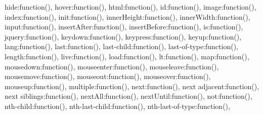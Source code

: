 \textquotesingle{}hide\textquotesingle{}\+:function()\lcurly{}\rcurly{}, \textquotesingle{}hover\textquotesingle{}\+:function()\lcurly{}\rcurly{}, \textquotesingle{}html\textquotesingle{}\+:function()\lcurly{}\rcurly{}, \textquotesingle{}id\textquotesingle{}\+:function()\lcurly{}\rcurly{}, \textquotesingle{}image\textquotesingle{}\+:function()\lcurly{}\rcurly{}, \textquotesingle{}index\textquotesingle{}\+:function()\lcurly{}\rcurly{}, \textquotesingle{}init\textquotesingle{}\+:function()\lcurly{}\rcurly{}, \textquotesingle{}inner\+Height\textquotesingle{}\+:function()\lcurly{}\rcurly{}, \textquotesingle{}inner\+Width\textquotesingle{}\+:function()\lcurly{}\rcurly{}, \textquotesingle{}input\textquotesingle{}\+:function()\lcurly{}\rcurly{}, \textquotesingle{}insert\+After\textquotesingle{}\+:function()\lcurly{}\rcurly{}, \textquotesingle{}insert\+Before\textquotesingle{}\+:function()\lcurly{}\rcurly{}, \textquotesingle{}is\textquotesingle{}\+:function()\lcurly{}\rcurly{}, \textquotesingle{}jquery\textquotesingle{}\+:function()\lcurly{}\rcurly{}, \textquotesingle{}keydown\textquotesingle{}\+:function()\lcurly{}\rcurly{}, \textquotesingle{}keypress\textquotesingle{}\+:function()\lcurly{}\rcurly{}, \textquotesingle{}keyup\textquotesingle{}\+:function()\lcurly{}\rcurly{}, \textquotesingle{}lang\textquotesingle{}\+:function()\lcurly{}\rcurly{}, \textquotesingle{}last\textquotesingle{}\+:function()\lcurly{}\rcurly{}, \textquotesingle{}last-\/child\textquotesingle{}\+:function()\lcurly{}\rcurly{}, \textquotesingle{}last-\/of-\/type\textquotesingle{}\+:function()\lcurly{}\rcurly{}, \textquotesingle{}length\textquotesingle{}\+:function()\lcurly{}\rcurly{}, \textquotesingle{}live\textquotesingle{}\+:function()\lcurly{}\rcurly{}, \textquotesingle{}load\textquotesingle{}\+:function()\lcurly{}\rcurly{}, \textquotesingle{}lt\textquotesingle{}\+:function()\lcurly{}\rcurly{}, \textquotesingle{}map\textquotesingle{}\+:function()\lcurly{}\rcurly{}, \textquotesingle{}mousedown\textquotesingle{}\+:function()\lcurly{}\rcurly{}, \textquotesingle{}mouseenter\textquotesingle{}\+:function()\lcurly{}\rcurly{}, \textquotesingle{}mouseleave\textquotesingle{}\+:function()\lcurly{}\rcurly{}, \textquotesingle{}mousemove\textquotesingle{}\+:function()\lcurly{}\rcurly{}, \textquotesingle{}mouseout\textquotesingle{}\+:function()\lcurly{}\rcurly{}, \textquotesingle{}mouseover\textquotesingle{}\+:function()\lcurly{}\rcurly{}, \textquotesingle{}mouseup\textquotesingle{}\+:function()\lcurly{}\rcurly{}, \textquotesingle{}multiple\textquotesingle{}\+:function()\lcurly{}\rcurly{}, \textquotesingle{}next\textquotesingle{}\+:function()\lcurly{}\rcurly{}, \textquotesingle{}next adjacent\textquotesingle{}\+:function()\lcurly{}\rcurly{}, \textquotesingle{}next siblings\textquotesingle{}\+:function()\lcurly{}\rcurly{}, \textquotesingle{}next\+All\textquotesingle{}\+:function()\lcurly{}\rcurly{}, \textquotesingle{}next\+Until\textquotesingle{}\+:function()\lcurly{}\rcurly{}, \textquotesingle{}not\textquotesingle{}\+:function()\lcurly{}\rcurly{}, \textquotesingle{}nth-\/child\textquotesingle{}\+:function()\lcurly{}\rcurly{}, \textquotesingle{}nth-\/last-\/child\textquotesingle{}\+:function()\lcurly{}\rcurly{}, \textquotesingle{}nth-\/last-\/of-\/type\textquotesingle{}\+:function()\lcurly{}\rcurly{}, 